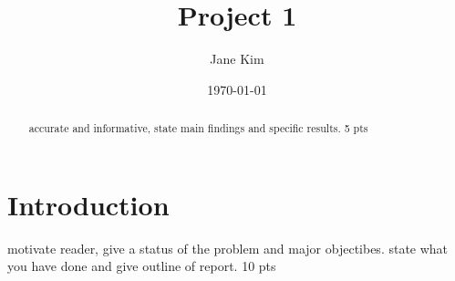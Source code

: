\documentclass[prb,aps,twocolumn,showpacs,10pt]{revtex4-1}
\begin{document}
\title {Project 1}

\author{Jane Kim}


\date{\today}


\begin{abstract}
\noindent accurate and informative, state main findings and specific results. 5 pts
\end{abstract}



\maketitle

\section{Introduction}

motivate reader, give a status of the problem and major objectibes. state what you have done and give outline of report. 10 pts
\end{document}
